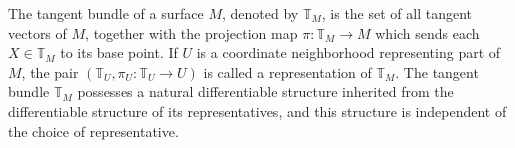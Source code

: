 The tangent bundle of a surface $M$, denoted by $\mathbb{T}_M$, is the set of all tangent vectors of $M$, together with the projection map $\pi: \mathbb{T}_M \rightarrow M$ which sends each $X \in \mathbb{T}_M$ to its base point. If $U$ is a coordinate neighborhood representing part of $M$, the pair $(\mathbb{T}_U, \pi_U: \mathbb{T}_U \rightarrow U)$ is called a representation of $\mathbb{T}_M$. The tangent bundle $\mathbb{T}_M$ possesses a natural differentiable structure inherited from the differentiable structure of its representatives, and this structure is independent of the choice of representative.
